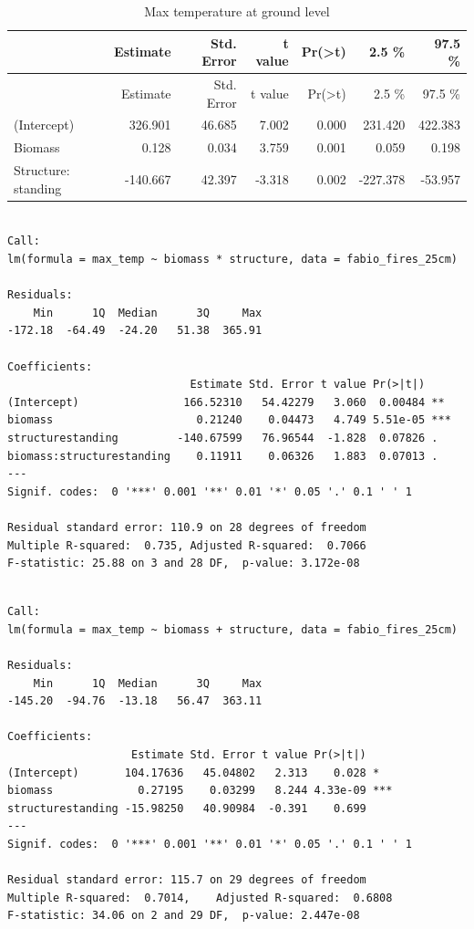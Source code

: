 \documentclass[11pt,a4paper]{article}
\begin{document}
\begin{longtable}[]{@{}lrrrrrr@{}}
\caption{Max temperature at ground level}\tabularnewline
\toprule
& Estimate & Std. Error & t value &
Pr(\textgreater{}\textbar{}t\textbar{}) & 2.5 \% & 97.5
\%\tabularnewline
\midrule
\endfirsthead
\toprule
& Estimate & Std. Error & t value &
Pr(\textgreater{}\textbar{}t\textbar{}) & 2.5 \% & 97.5
\%\tabularnewline
\midrule
\endhead
(Intercept) & 326.901 & 46.685 & 7.002 & 0.000 & 231.420 &
422.383\tabularnewline
Biomass & 0.128 & 0.034 & 3.759 & 0.001 & 0.059 & 0.198\tabularnewline
Structure: standing & -140.667 & 42.397 & -3.318 & 0.002 & -227.378 &
-53.957\tabularnewline
\bottomrule
\end{longtable}

\begin{verbatim}

Call:
lm(formula = max_temp ~ biomass * structure, data = fabio_fires_25cm)

Residuals:
    Min      1Q  Median      3Q     Max 
-172.18  -64.49  -24.20   51.38  365.91 

Coefficients:
                            Estimate Std. Error t value Pr(>|t|)    
(Intercept)                166.52310   54.42279   3.060  0.00484 ** 
biomass                      0.21240    0.04473   4.749 5.51e-05 ***
structurestanding         -140.67599   76.96544  -1.828  0.07826 .  
biomass:structurestanding    0.11911    0.06326   1.883  0.07013 .  
---
Signif. codes:  0 '***' 0.001 '**' 0.01 '*' 0.05 '.' 0.1 ' ' 1

Residual standard error: 110.9 on 28 degrees of freedom
Multiple R-squared:  0.735, Adjusted R-squared:  0.7066 
F-statistic: 25.88 on 3 and 28 DF,  p-value: 3.172e-08
\end{verbatim}

\begin{verbatim}

Call:
lm(formula = max_temp ~ biomass + structure, data = fabio_fires_25cm)

Residuals:
    Min      1Q  Median      3Q     Max 
-145.20  -94.76  -13.18   56.47  363.11 

Coefficients:
                   Estimate Std. Error t value Pr(>|t|)    
(Intercept)       104.17636   45.04802   2.313    0.028 *  
biomass             0.27195    0.03299   8.244 4.33e-09 ***
structurestanding -15.98250   40.90984  -0.391    0.699    
---
Signif. codes:  0 '***' 0.001 '**' 0.01 '*' 0.05 '.' 0.1 ' ' 1

Residual standard error: 115.7 on 29 degrees of freedom
Multiple R-squared:  0.7014,    Adjusted R-squared:  0.6808 
F-statistic: 34.06 on 2 and 29 DF,  p-value: 2.447e-08
\end{verbatim}
\end{document}
